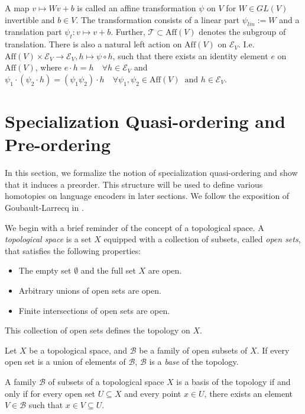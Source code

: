 A map $v\mapsto Wv +b$ is called an affine transformation $\psi$ on $V$ for $W\in GL(V)$ invertible and $b \in V$.
The transformation consists of a linear part $\psi_{lin}:=W$ and a translation part $\psi_t:v\mapsto v+b$.
Further, $\mathcal{T}\subset \text{Aff}(V)$ denotes the subgroup of translation.
There is also a natural left action on $\text{Aff}(V)$ on $\mathcal{E}_V$.
I.e. $\text{Aff}(V)\times \mathcal{E}_V\rightarrow \mathcal{E}_V, h \mapsto \psi\circ h$, such that there exists an identity element $e$ on $\text{Aff}(V)$, where $e\cdot h = h \quad \forall h\in \mathcal{E}_V$ and $\psi_1\cdot(\psi_2\cdot h)=(\psi_1\psi_2)\cdot h \quad \forall \psi_1,\psi_2 \in \text{Aff}(V)\ \text{ and } h \in \mathcal{E}_V$.

\section{Specialization Quasi-ordering and Pre-ordering}\label{sec:sqp}
In this section, we formalize the notion of specialization quasi-ordering and show that it induces a preorder.
This structure will be used to define various homotopies on language encoders in later sections.
We follow the exposition of Goubault-Larrecq in \cite{goubault-larrecq_non-hausdorff_nodate}.

We begin with a brief reminder of the concept of a topological space.
A \emph{topological space} is a set $X$ equipped with a collection of subsets, called \emph{open sets}, that satisfies the following properties:
\begin{itemize}
\item The empty set $\emptyset$ and the full set $X$ are open.
\item Arbitrary unions of open sets are open.
\item Finite intersections of open sets are open.
\end{itemize}
This collection of open sets defines the topology on $X$.

\begin{definition}[Base]
        Let $X$ be a topological space, and $\mathcal{B}$ be a family of open subsets of $X$.
        If every open set is a union of elements of $\mathcal{B}$, $\mathcal{B}$ is a \emph{base} of the topology. 
\end{definition}

\begin{lemma}\label{lem:basis_characterization}
A family \(\mathcal{B}\) of subsets of a topological space \(X\) is a basis of the topology if and only if for every open set \(U \subseteq X\) and every point \(x \in U\), there exists an element \(V \in \mathcal{B}\) such that \(x \in V \subseteq U\).
\end{lemma}

